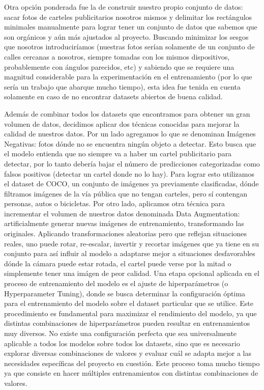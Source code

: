 \documentclass[a4paper]{article}
\begin{document}
Otra opción ponderada fue la de construir nuestro propio conjunto de datos: sacar fotos de carteles publicitarios nosotros mismos y delimitar los rectángulos minimales manualmente para lograr tener un conjunto de datos que sabemos que son orgánicos y aún más ajustados al proyecto. Buscando minimizar los sesgos que nosotros introduciríamos (nuestras fotos serían solamente de un conjunto de calles cercanas a nosotros, siempre tomadas con los mismos dispositivos, probablemente con ángulos parecidos, etc) y sabiendo que se requiere una magnitud considerable para la experimentación en el entrenamiento (por lo que sería un trabajo que abarque mucho tiempo), esta idea fue tenida en cuenta solamente en caso de no encontrar datasets abiertos de buena calidad.

Además de combinar todos los datasets que encontramos para obtener un gran volumen de datos, decidimos aplicar dos técnicas conocidas para mejorar la calidad de nuestros datos. Por un lado agregamos lo que se denominan Imágenes Negativas: fotos dónde no se encuentra ningún objeto a detectar. Esto busca que el modelo entienda que no siempre va a haber un cartel publicitario para detectar, por lo tanto debería bajar el número de predicciones categorizadas como falsos positivos (detectar un cartel donde no lo hay). Para lograr esto utilizamos el dataset de COCO, un conjunto de imágenes ya previamente clasificadas, dónde filtramos imágenes de la vía pública que no tengan carteles, pero sí contengan personas, autos o bicicletas.
Por otro lado, aplicamos otra técnica para incrementar el volumen de nuestros datos denominada Data Augmentation: artificialmente generar nuevas imágenes de entrenamiento, transformando las originales. Aplicando transformaciones aleatorias pero que reflejan situaciones reales, uno puede rotar, re-escalar, invertir y recortar imágenes que ya tiene en su conjunto para así influir al modelo a adaptarse mejor a situaciones desfavorables dónde la cámara puede estar rotada, el cartel puede verse por la mitad o simplemente tener una imágen de peor calidad.
Una etapa opcional aplicada en el proceso de entrenamiento del modelo es el ajuste de hiperparámetros (o Hyperparameter Tuning), donde se busca determinar la configuración óptima para el entrenamiento del modelo sobre el dataset particular que se utilice. Este procedimiento es fundamental para maximizar el rendimiento del modelo, ya que distintas combinaciones de hiperparámetros pueden resultar en entrenamientos muy diversos. No existe una configuración perfecta que sea universalmente aplicable a todos los modelos sobre todos los datasets, sino que es necesario explorar diversas combinaciones de valores y evaluar cuál se adapta mejor a las necesidades específicas del proyecto en cuestión. Este proceso toma mucho tiempo ya que consiste en hacer múltiples entrenamientos con distintas combinaciones de valores.
\end{document}
